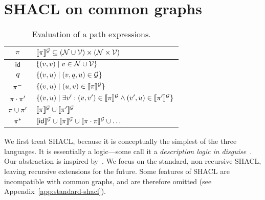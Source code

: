 

\section{SHACL on common graphs}
\label{sec:shacl}

\begin{table}[t]
  \caption{Evaluation of a path expressions.}
  \label{tab:seme2}
  \centering
  \begin{tabular}{cl}
    \toprule
    $\pi$ & $\llbracket \pi \rrbracket^{\mathcal{G}} \subseteq (\mathcal{N}\cup\mathcal{V})\times(\mathcal{N} \times \mathcal{V})\ $ \\ %
    \midrule
    $\mathsf{id}$ & $\{ (v,v) \mid v \in \mathcal{N}  \cup \mathcal{V} \}$\\[2pt]
    $q$ & $\{(v,u)\mid (v,q,u)\in \mathcal{G} \}$ \\[2pt]
    $\pi^{-}$ & $\{(v,u)\mid (u,v) \in \llbracket \pi \rrbracket^{\mathcal{G}}\}$ \\[2pt]
    $\pi \cdot \pi'$ & $\{(v,u) \mid \exists v': (v,v')\in\llbracket \pi \rrbracket^{\mathcal{G}}\land (v',u)\in\llbracket \pi' \rrbracket^{\mathcal{G}}\}$ \\[2pt]
    $\pi\cup \pi'$ & $\llbracket \pi \rrbracket^{\mathcal{G}}\cup\llbracket \pi' \rrbracket^{\mathcal{G}}$\\[2pt]
   $\pi^{*}$ & $ \llbracket \mathsf{id} \rrbracket^{\mathcal{G}} \cup \llbracket \pi \rrbracket^{\mathcal{G}}  \cup \llbracket \pi \cdot \pi \rrbracket^{\mathcal{G}} \cup \ldots $ \\[2pt]
    \bottomrule
  \end{tabular}
\end{table}

\newcommand{\defs}{\mathit{def}}
\renewcommand{\models}{\vDash}
\newcommand{\nmodels}{\nvDash}

We first treat SHACL, because it is conceptually the simplest of the three
languages.
It is essentially a logic---some call it a \emph{description logic in
disguise}~\cite{BJB22}.
Our abstraction is inspired by~\cite{MJPHD}.
We focus on the standard, non-recursive SHACL, leaving recursive extensions
\cite{CRS18,ACORSS20,BJ21,PKM22,OS24} for the future.
Some features of SHACL are incompatible with common graphs, and are therefore
omitted (see Appendix~\ref{app:standard-shacl}).

